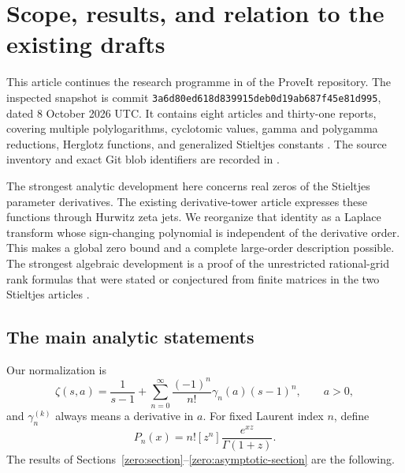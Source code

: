 \documentclass[11pt,a4paper]{article}
\theoremstyle{definition}
\theoremstyle{remark}
\numberwithin{equation}{section}
\begin{document}
\section{Scope, results, and relation to the existing drafts}
\label{intro:section}

This article continues the research programme in
 of the ProveIt repository.
The inspected snapshot is commit
\texttt{3a6d80ed618d839915deb0d19ab687f45e81d995},
dated 8 October 2026 UTC.  It contains eight articles and thirty-one
reports, covering multiple polylogarithms, cyclotomic values, gamma and
polygamma reductions, Herglotz functions, and generalized Stieltjes
constants \cite{RepoSnapshot}.  The source inventory and exact Git blob
identifiers are recorded in .

The strongest analytic development here concerns real zeros of the
Stieltjes parameter derivatives.  The existing derivative-tower article
\cite{DraftTower} expresses these functions through Hurwitz zeta jets.
We reorganize that identity as a Laplace transform whose sign-changing
polynomial is independent of the derivative order.  This makes a global
zero bound and a complete large-order description possible.
The strongest algebraic development is a proof of the unrestricted
rational-grid rank formulas that were stated or conjectured from finite
matrices in the two Stieltjes articles \cite{DraftTower,DraftLadder}.

\subsection{The main analytic statements}

Our normalization is
\begin{equation}\label{intro:stieltjes}
 \zeta(s,a)=\frac1{s-1}
       +\sum_{n=0}^{\infty}\frac{(-1)^n}{n!}\gamma_n(a)(s-1)^n,
 \qquad a>0,
\end{equation}
and $\gamma_n^{(k)}$ always means a derivative in $a$.
For fixed Laurent index $n$, define
\[
 P_n(x)=n![z^n]\frac{e^{xz}}{\Gamma(1+z)}.
\]
The results of Sections~\ref{zero:section}--\ref{zero:asymptotic-section}
are the following.
\end{document}
